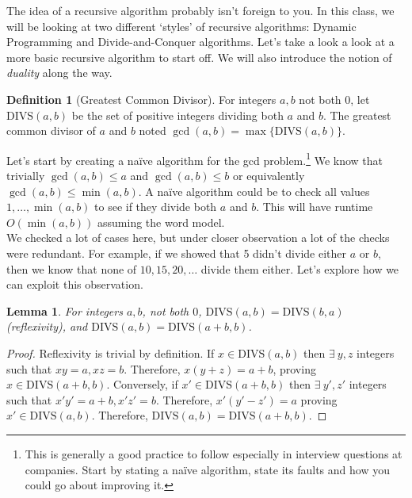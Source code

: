 \documentclass[10pt]{article}
\theoremstyle{plain}
\newtheorem{lem}[thm]{Lemma}
\theoremstyle{definition}
\newtheorem{defn}[thm]{Definition} %
\numberwithin{equation}{section}
\numberwithin{figure}{section}
\begin{document}
\noindent The idea of a recursive algorithm probably isn't foreign to you. In this class, we will be looking at two different `styles' of recursive algorithms: Dynamic Programming and Divide-and-Conquer algorithms. Let's take a look a look at a more basic recursive algorithm to start off. We will also introduce the notion of \emph{duality} along the way.

\begin{defn}[Greatest Common Divisor]
For integers $a, b$ not both $0$, let $\mathrm{DIVS}(a,b)$ be the set of positive integers dividing both $a$ and $b$. The greatest common divisor of $a$ and $b$ noted $\gcd(a,b) = \max \{\mathrm{DIVS}(a,b)\}$. 
\end{defn}

\noindent Let's start by creating a na\"ive algorithm for the gcd problem.\footnote{This is generally a good practice to follow especially in interview questions at companies. Start by stating a na\"ive algorithm, state its faults and how you could go about improving it.} We know that trivially $\gcd(a,b) \leq a$ and $\gcd(a,b) \leq b$ or equivalently $\gcd(a,b) \leq \min(a,b)$. A na\"ive algorithm could be to check all values $1, \ldots, \min(a,b)$ to see if they divide both $a$ and $b$. This will have runtime $O(\min(a,b))$ assuming the word model. \\

\noindent We checked a lot of cases here, but under closer observation a lot of the checks were redundant. For example, if we showed that 5 didn't divide either $a$ or $b$, then we know that none of $10, 15, 20, \ldots$ divide them either. Let's explore how we can exploit this observation.

\begin{lem}
For integers $a, b$, not both $0$, $\mathrm{DIVS}(a,b) = \mathrm{DIVS}(b,a)$ (reflexivity), and $\mathrm{DIVS}(a,b) = \mathrm{DIVS}(a+b,b)$.
\end{lem}

\begin{proof}
Reflexivity is trivial by definition. If $x \in \mathrm{DIVS}(a,b)$ then $\exists \ y, z$ integers such that $xy = a, xz = b$. Therefore, $x(y + z) = a + b$, proving $x \in \mathrm{DIVS}(a+b,b)$. Conversely, if $x' \in \mathrm{DIVS}(a+b,b)$ then $\exists \ y', z'$ integers such that $x' y' = a + b, x' z' = b$. Therefore, $x' (y ' - z') = a$ proving $x' \in \mathrm{DIVS}(a,b)$. Therefore, $\mathrm{DIVS}(a,b) = \mathrm{DIVS}(a+b,b)$.
\end{proof}
\end{document}
